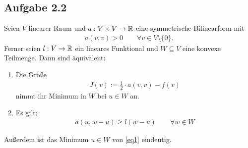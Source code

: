 \subsection{Aufgabe 2.2}
Seien $V$ linearer Raum und $a:V\times V\to\mathbb{R}$ eine symmetrische Bilinearform mit
\begin{align*}
	a(v,v)>0\qquad\forall v\in V\setminus\lbrace0\rbrace.
\end{align*}
Ferner seien $l:V\to\mathbb{R}$ ein lineares Funktional und $W\subseteq V$ eine konvexe Teilmenge. 
Dann sind äquivalent:
\begin{enumerate}[label=(\roman*)]
	\item Die Größe
	\begin{align}\label{eq1}
		J(v):=\frac{1}{2}\cdot a(v,v)-f(v)
	\end{align}
	nimmt ihr Minimum in $W$ bei $u\in W$ an.
	\item Es gilt:
	\begin{align}\label{eq2}
		a(u,w-u)\geq l(w-u)\qquad\forall w\in W
	\end{align}
\end{enumerate}
Außerdem ist das Minimum $u\in W$ von \eqref{eq1} eindeutig.

